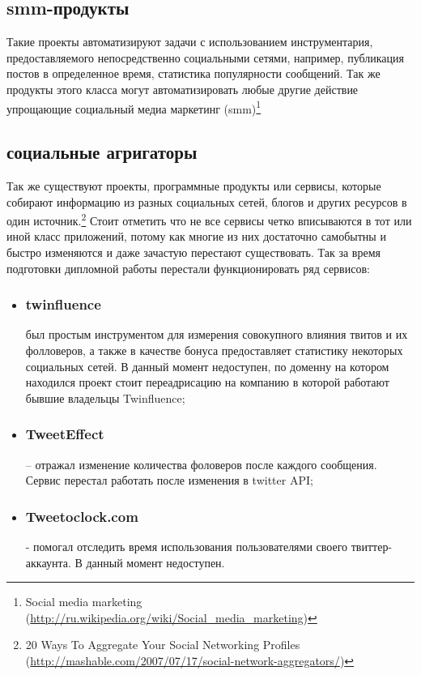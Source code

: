\subsection{smm-продукты}
Такие проекты автоматизируют задачи с использованием инструментария, предоставляемого непосредственно социальными сетями, например, публикация постов в определенное время, статистика популярности сообщений. Так же продукты этого класса могут автоматизировать любые другие действие упрощающие социальный медиа маркетинг (smm)\footnote{Social media marketing (\url{http://ru.wikipedia.org/wiki/Social_media_marketing})}
\subsection{социальные агригаторы}
Так же существуют проекты, программные продукты или сервисы, которые собирают информацию из разных социальных сетей, блогов и других ресурсов в один источник.\footnote{20 Ways To Aggregate Your Social Networking Profiles (\url{http://mashable.com/2007/07/17/social-network-aggregators/})} 
Стоит отметить что не все сервисы четко вписываются в тот или иной класс приложений, потому как многие из них достаточно самобытны и быстро изменяются и даже зачастую перестают существовать. Так за время подготовки дипломной работы перестали функционировать ряд сервисов:
\begin{itemize}
\item \subsubsection{twinfluence} был простым инструментом для измерения совокупного влияния твитов и их фолловеров, а также в качестве бонуса предоставляет статистику некоторых социальных сетей. В данный момент недоступен, по доменну на котором находился проект стоит переадрисацию на компанию в которой работают бывшие владельцы Twinfluence;
\item \subsubsection{TweetEffect} – отражал изменение количества фоловеров после каждого сообщения. Сервис перестал работать после изменения в twitter API;
\item \subsubsection {Tweetoclock.com} - помогал отследить время использования пользователями своего твиттер-аккаунта. В данный момент недоступен.
\end{itemize}

